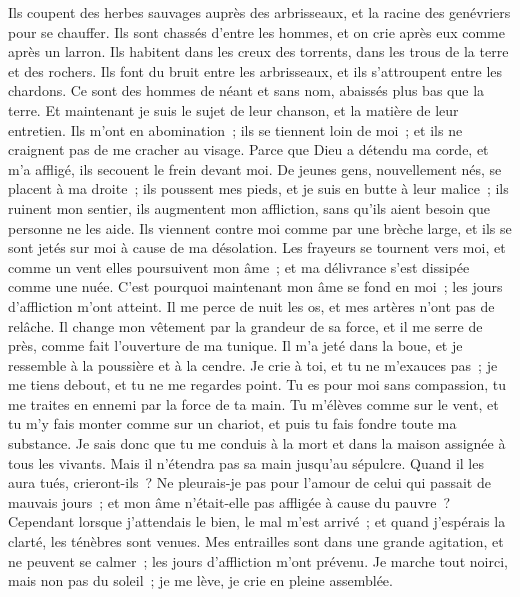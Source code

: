 \begin{multicols}{2}
Ils coupent des herbes sauvages auprès des arbrisseaux, et la racine des genévriers pour se chauffer.
Ils sont chassés d'entre les hommes, et on crie après eux comme après un larron.
Ils habitent dans les creux des torrents, dans les trous de la terre et des rochers.
Ils font du bruit entre les arbrisseaux, et ils s'attroupent entre les chardons.
Ce sont des hommes de néant et sans nom, abaissés plus bas que la terre.
Et maintenant je suis le sujet de leur chanson, et la matière de leur entretien.
Ils m'ont en abomination~; ils se tiennent loin de moi~; et ils ne craignent pas de me cracher au visage.
Parce que Dieu a détendu ma corde, et m'a affligé, ils secouent le frein devant moi.
De jeunes gens, nouvellement nés, se placent à ma droite~; ils poussent mes pieds, et je suis en butte à leur malice~;
ils ruinent mon sentier, ils augmentent mon affliction, sans qu'ils aient besoin que personne ne les aide.
Ils viennent contre moi comme par une brèche large, et ils se sont jetés sur moi à cause de ma désolation.
Les frayeurs se tournent vers moi, et comme un vent elles poursuivent mon âme~; et ma délivrance s'est dissipée comme une nuée.
C'est pourquoi maintenant mon âme se fond en moi~; les jours d'affliction m'ont atteint.
Il me perce de nuit les os, et mes artères n'ont pas de relâche.
Il change mon vêtement par la grandeur de sa force, et il me serre de près, comme fait l'ouverture de ma tunique.
Il m'a jeté dans la boue, et je ressemble à la poussière et à la cendre.
Je crie à toi, et tu ne m'exauces pas~; je me tiens debout, et tu ne me regardes point.
Tu es pour moi sans compassion, tu me traites en ennemi par la force de ta main.
Tu m'élèves comme sur le vent, et tu m'y fais monter comme sur un chariot, et puis tu fais fondre toute ma substance.
Je sais donc que tu me conduis à la mort et dans la maison assignée à tous les vivants.
Mais il n'étendra pas sa main jusqu'au sépulcre. Quand il les aura tués, crieront-ils~?
Ne pleurais-je pas pour l'amour de celui qui passait de mauvais jours~; et mon âme n'était-elle pas affligée à cause du pauvre~?
Cependant lorsque j'attendais le bien, le mal m'est arrivé~; et quand j'espérais la clarté, les ténèbres sont venues.
Mes entrailles sont dans une grande agitation, et ne peuvent se calmer~; les jours d'affliction m'ont prévenu.
Je marche tout noirci, mais non pas du soleil~; je me lève, je crie en pleine assemblée.

\end{multicols}
